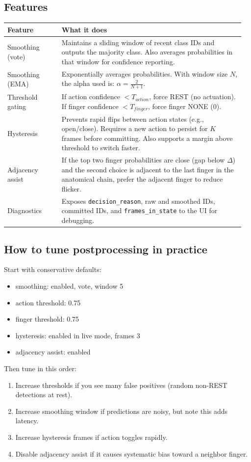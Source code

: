 \documentclass[11pt]{article}
\begin{document}
\subsection{Features}
\begin{longtable}{p{0.22\linewidth} p{0.74\linewidth}}
\toprule
Feature & What it does \\
\midrule
Smoothing (vote) & Maintains a sliding window of recent class IDs and outputs the majority class. Also averages probabilities in that window for confidence reporting.\\
Smoothing (EMA) & Exponentially averages probabilities. With window size $N$, the alpha used is:
$\alpha = \frac{2}{N+1}$.\\
Threshold gating & If action confidence $< T_{action}$, force REST (no actuation). If finger confidence $< T_{finger}$, force finger NONE (0).\\
Hysteresis & Prevents rapid flips between action states (e.g., open/close). Requires a new action to persist for $K$ frames before committing. Also supports a margin above threshold to switch faster.\\
Adjacency assist & If the top two finger probabilities are close (gap below $\Delta$) and the second choice is adjacent to the last finger in the anatomical chain, prefer the adjacent finger to reduce flicker.\\
Diagnostics & Exposes \texttt{decision\_reason}, raw and smoothed IDs, committed IDs, and \texttt{frames\_in\_state} to the UI for debugging.\\
\bottomrule
\end{longtable}

\subsection{How to tune postprocessing in practice}
Start with conservative defaults:
\begin{itemize}[leftmargin=*]
\item smoothing: enabled, vote, window 5
\item action threshold: 0.75
\item finger threshold: 0.75
\item hysteresis: enabled in live mode, frames 3
\item adjacency assist: enabled
\end{itemize}
Then tune in this order:
\begin{enumerate}[leftmargin=*]
\item Increase thresholds if you see many false positives (random non-REST detections at rest).
\item Increase smoothing window if predictions are noisy, but note this adds latency.
\item Increase hysteresis frames if action toggles rapidly.
\item Disable adjacency assist if it causes systematic bias toward a neighbor finger.
\end{enumerate}
\end{document}
